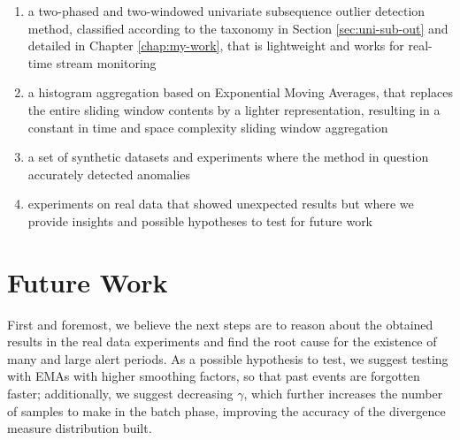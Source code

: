\begin{enumerate}
    \item a two-phased and two-windowed univariate subsequence outlier detection method, classified according to the taxonomy in Section \ref{sec:uni-sub-out} and detailed in Chapter \ref{chap:my-work}, that is lightweight and works for real-time stream monitoring
    
    \item a histogram aggregation based on Exponential Moving Averages, that replaces the entire sliding window contents by a lighter representation, resulting in a constant in time and space complexity sliding window aggregation
    
    \item a set of synthetic datasets and experiments where the method in question accurately detected anomalies
    
    \item experiments on real data that showed unexpected results but where we provide insights and possible hypotheses to test for future work
\end{enumerate}

\section{Future Work}

First and foremost, we believe the next steps are to reason about the obtained results in the real data experiments and find the root cause for the existence of many and large alert periods. As a possible hypothesis to test, we suggest testing with EMAs with higher smoothing factors, so that past events are forgotten faster; additionally, we suggest decreasing $\gamma$, which further increases the number of samples to make in the batch phase, improving the accuracy of the divergence measure distribution built.

